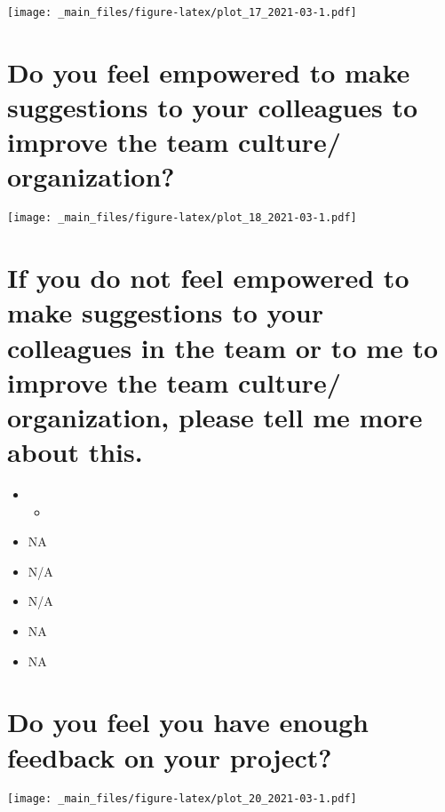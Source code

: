 \documentclass[
]{book}
\providecommand{\tightlist}{%
  \setlength{\itemsep}{0pt}\setlength{\parskip}{0pt}}
\begin{document}
\texttt{[image: \_main\_files/figure-latex/plot\_17\_2021-03-1.pdf]}

\hypertarget{do-you-feel-empowered-to-make-suggestions-to-your-colleagues-to-improve-the-team-culture-organization-1}{%
\section{Do you feel empowered to make suggestions to your colleagues to improve the team culture/ organization?}\label{do-you-feel-empowered-to-make-suggestions-to-your-colleagues-to-improve-the-team-culture-organization-1}}

\texttt{[image: \_main\_files/figure-latex/plot\_18\_2021-03-1.pdf]}

\hypertarget{if-you-do-not-feel-empowered-to-make-suggestions-to-your-colleagues-in-the-team-or-to-me-to-improve-the-team-culture-organization-please-tell-me-more-about-this.-1}{%
\section{If you do not feel empowered to make suggestions to your colleagues in the team or to me to improve the team culture/ organization, please tell me more about this.}\label{if-you-do-not-feel-empowered-to-make-suggestions-to-your-colleagues-in-the-team-or-to-me-to-improve-the-team-culture-organization-please-tell-me-more-about-this.-1}}

\begin{itemize}
\item
  \begin{itemize}
  \tightlist
  \item
  \end{itemize}
\item
  NA
\item
  N/A
\item
  N/A
\item
  NA
\item
  NA
\end{itemize}

\hypertarget{do-you-feel-you-have-enough-feedback-on-your-project-1}{%
\section{Do you feel you have enough feedback on your project?}\label{do-you-feel-you-have-enough-feedback-on-your-project-1}}

\texttt{[image: \_main\_files/figure-latex/plot\_20\_2021-03-1.pdf]}
\end{document}
